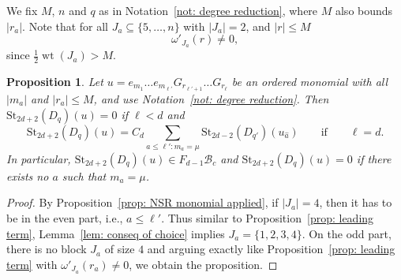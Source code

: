\documentclass[12pt]{amsart}
\theoremstyle{plain}
\newtheorem{proposition}[theorem]{Proposition}
\theoremstyle{definition}
\numberwithin{equation}{theorem}
\newcommand{\calB}{\mathcal B}
\newcommand{\St}{\mathrm{St}}
\newcommand{\length}[1]{\left\lvert #1\right\rvert}
\newcommand{\wt}{\operatorname{wt}}
\begin{document}
We fix $M$, $n$ and $q$ as in Notation~\ref{not: degree reduction}, where $M$ also bounds $\length{r_a}$. Note that for all $J_a \subseteq \{5, \dots, n\}$ with $\length{J_a} = 2$, and $\length{r} \le M$
\begin{equation}
    \omega'_{J_a}(r) \neq 0,
\end{equation}
since $\frac{1}{2} \wt(J_a) > M$.

\begin{proposition}\label{prop: NSR leading term}
 Let $u = e_{m_1} \dots e_{m_{\ell'}} G_{r_{\ell'+1}} \dots G_{r_\ell}$ be an ordered monomial with all $\length{m_a}$ and  $ \length{r_a} \leq M$, and use Notation~\ref{not: degree reduction}. Then $\St_{2d+2}(D_q)(u) = 0$ if $\ell <d$ and 
    \begin{equation}
            \St_{2d+2}(D_q)(u) = C_d \sum_{a \leq \ell': m_a = \mu} \St_{2d-2}(D_{q'})(u_{\hat{a}}) \qquad \text{if} \qquad \ell=d.
        \end{equation}    
    In particular, $\St_{2d+2}(D_q)(u) \in F_{d-1} \calB_c$ and $\St_{2d+2}(D_q)(u) = 0$ if there exists no $a$ such that $m_a = \mu$.
\end{proposition}
\begin{proof}
    By Proposition~\ref{prop: NSR monomial applied}, if $\length{J_a} = 4$, then it has to be in the even part, i.e., $a \leq \ell'$. Thus similar to Proposition~\ref{prop: leading term}, Lemma~\ref{lem: conseq of choice} implies $J_a = \{1, 2, 3, 4\}$. On the odd part, there is no block $J_a$ of size $4$ and  arguing exactly like Proposition~\ref{prop: leading term} with $\omega'_{J_a}(r_a) \neq 0$, we obtain the proposition.
\end{proof}
\end{document}
